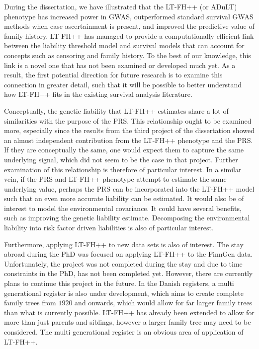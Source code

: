 During the dissertation, we have illustrated that the LT-FH++ (or ADuLT) phenotype has increased power in GWAS, outperformed standard survival GWAS methods when case ascertainment is present, and improved the predictive value of family history. LT-FH++ has managed to provide a computationally efficient link between the liability threshold model and survival models that can account for concepts such as censoring and family history. To the best of our knowledge, this link is a novel one that has not been examined or developed much yet. As a result, the first potential direction for future research is to examine this connection in greater detail, such that it will be possible to better understand how LT-FH++ fits in the existing survival analysis literature.

Conceptually, the genetic liability that LT-FH++ estimates share a lot of similarities with the purpose of the PRS. This relationship ought to be examined more, especially since the results from the third project of the dissertation showed an almost independent contribution from the LT-FH++ phenotype and the PRS. If they are conceptually the same, one would expect them to capture the same underlying signal, which did not seem to be the case in that project. Further examination of this relationship is therefore of particular interest. In a similar vein, if the PRS and LT-FH++ phenotype attempt to estimate the same underlying value, perhaps the PRS can be incorporated into the LT-FH++ model such that an even more accurate liability can be estimated. It would also be of interest to model the environmental covariance. It could have several benefits, such as improving the genetic liability estimate. Decomposing the environmental liability into risk factor driven liabilities is also of particular interest.

Furthermore, applying LT-FH++ to new data sets is also of interest. The stay abroad during the PhD was focused on applying LT-FH++ to the FinnGen data. Unfortunately, the project was not completed during the stay and due to time constraints in the PhD, has not been completed yet. However, there are currently plans to continue this project in the future. In the Danish registers, a multi generational register is also under development, which aims to create complete family trees from $ 1920 $ and onwards, which would allow for far larger family trees than what is currently possible. LT-FH++ has already been extended to allow for more than just parents and siblings, however a larger family tree may need to be considered. The multi generational register is an obvious area of application of LT-FH++. 


